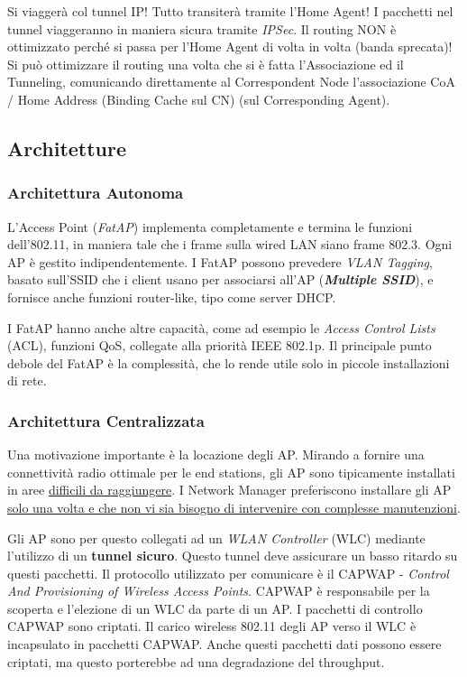 Si viaggerà col tunnel IP! Tutto transiterà tramite l'Home Agent! I pacchetti nel tunnel viaggeranno in maniera sicura tramite \textit{IPSec}. Il routing NON è ottimizzato perché si passa per l'Home Agent di volta in volta (banda sprecata)! Si può ottimizzare il routing una volta che si è fatta l'Associazione ed il Tunneling, comunicando direttamente al Correspondent Node l'associazione CoA / Home Address (Binding Cache sul CN) (sul Corresponding Agent).

\subsection{Architetture}

\subsubsection{Architettura Autonoma}

L'Access Point (\textit{FatAP}) implementa completamente e termina le funzioni dell'802.11, in maniera tale che i frame sulla wired LAN siano frame 802.3. Ogni AP è gestito indipendentemente. I FatAP possono prevedere \textit{VLAN Tagging}, basato sull'SSID che i client usano per associarsi all'AP (\textit{\textbf{Multiple SSID}}), e fornisce anche funzioni router-like, tipo come server DHCP.

I FatAP hanno anche altre capacità, come ad esempio le \textit{Access Control Lists} (ACL), funzioni QoS, collegate alla priorità IEEE 802.1p. Il principale punto debole del FatAP è la complessità, che lo rende utile solo in piccole installazioni di rete.

\subsubsection{Architettura Centralizzata}

Una motivazione importante è la locazione degli AP. Mirando a fornire una connettività radio ottimale per le end stations, gli AP sono tipicamente installati in aree  \underline{difficili da raggiungere}. I Network Manager preferiscono installare gli AP \newline\underline{solo una volta e che non vi sia bisogno di intervenire con complesse manutenzioni}.

Gli AP sono per questo collegati ad un \textit{WLAN Controller} (WLC) mediante l'utilizzo di un \textbf{tunnel sicuro}. Questo tunnel deve assicurare un basso ritardo su questi pacchetti. Il protocollo utilizzato per comunicare è il CAPWAP - \textit{Control And Provisioning of Wireless Access Points}. CAPWAP è responsabile per la scoperta e l'elezione di un WLC da parte di un AP. I pacchetti di controllo CAPWAP sono criptati. Il carico wireless 802.11 degli AP verso il WLC è incapsulato in pacchetti CAPWAP. Anche questi pacchetti dati possono essere criptati, ma questo porterebbe ad una degradazione del throughput. 

